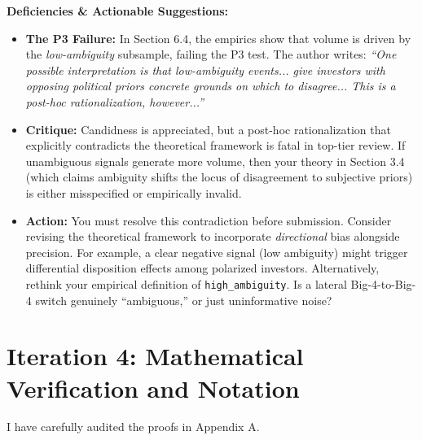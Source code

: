 \documentclass[12pt]{article}
\begin{document}
\textbf{Deficiencies \& Actionable Suggestions:}
\begin{itemize}
    \item \textbf{The P3 Failure:} In Section 6.4, the empirics show that volume is driven by the \textit{low-ambiguity} subsample, failing the P3 test. The author writes: \textit{``One possible interpretation is that low-ambiguity events... give investors with opposing political priors concrete grounds on which to disagree... This is a post-hoc rationalization, however...''} 
    \item \textbf{Critique:} Candidness is appreciated, but a post-hoc rationalization that explicitly contradicts the theoretical framework is fatal in top-tier review. If unambiguous signals generate more volume, then your theory in Section 3.4 (which claims ambiguity shifts the locus of disagreement to subjective priors) is either misspecified or empirically invalid.
    \item \textbf{Action:} You must resolve this contradiction before submission. Consider revising the theoretical framework to incorporate \textit{directional} bias alongside precision. For example, a clear negative signal (low ambiguity) might trigger differential disposition effects among polarized investors. Alternatively, rethink your empirical definition of \texttt{high\_ambiguity}. Is a lateral Big-4-to-Big-4 switch genuinely ``ambiguous,'' or just uninformative noise?
\end{itemize}


\section{Iteration 4: Mathematical Verification and Notation}

I have carefully audited the proofs in Appendix A. 
\end{document}
